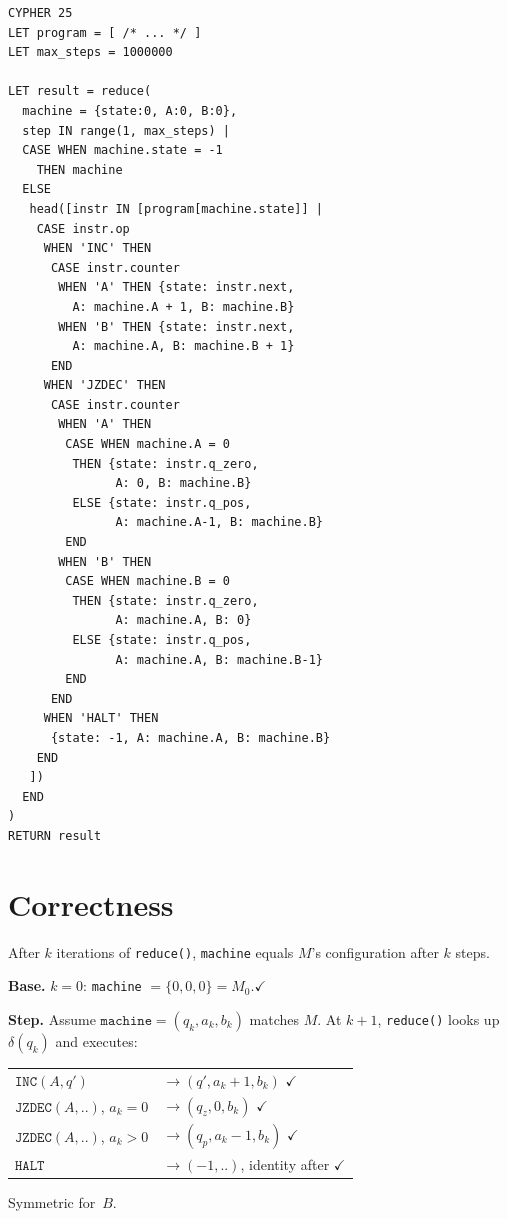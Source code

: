 \documentclass[sigconf, nonacm]{acmart}
\begin{document}
\begin{codeblock}
\begin{lstlisting}[style=cypher]
CYPHER 25
LET program = [ /* ... */ ]
LET max_steps = 1000000

LET result = reduce(
  machine = {state:0, A:0, B:0},
  step IN range(1, max_steps) |
  CASE WHEN machine.state = -1
    THEN machine
  ELSE
   head([instr IN [program[machine.state]] |
    CASE instr.op
     WHEN 'INC' THEN
      CASE instr.counter
       WHEN 'A' THEN {state: instr.next,
         A: machine.A + 1, B: machine.B}
       WHEN 'B' THEN {state: instr.next,
         A: machine.A, B: machine.B + 1}
      END
     WHEN 'JZDEC' THEN
      CASE instr.counter
       WHEN 'A' THEN
        CASE WHEN machine.A = 0
         THEN {state: instr.q_zero,
               A: 0, B: machine.B}
         ELSE {state: instr.q_pos,
               A: machine.A-1, B: machine.B}
        END
       WHEN 'B' THEN
        CASE WHEN machine.B = 0
         THEN {state: instr.q_zero,
               A: machine.A, B: 0}
         ELSE {state: instr.q_pos,
               A: machine.A, B: machine.B-1}
        END
      END
     WHEN 'HALT' THEN
      {state: -1, A: machine.A, B: machine.B}
    END
   ])
  END
)
RETURN result
\end{lstlisting}
\end{codeblock}

\section{Correctness}

\begin{claimbox}[Claim]
After $k$ iterations of \texttt{reduce()}, \texttt{machine} equals
$M$'s configuration after $k$ steps.
\end{claimbox}

\begin{proofbox}
\textbf{Base.} $k{=}0$: \texttt{machine} $= \{0,0,0\} = M_0$.\enspace$\checkmark$

\textbf{Step.} Assume $\texttt{machine} = (q_k, a_k, b_k)$ matches $M$.
At $k{+}1$, \texttt{reduce()} looks up $\delta(q_k)$ and executes:

{\small
\begin{tabular}{@{}ll@{}}
$\texttt{INC}(A,q')$ & $\to (q', a_k{+}1, b_k)$ \enspace$\checkmark$ \\
$\texttt{JZDEC}(A,..)$, $a_k{=}0$ & $\to (q_z, 0, b_k)$ \enspace$\checkmark$ \\
$\texttt{JZDEC}(A,..)$, $a_k{>}0$ & $\to (q_p, a_k{-}1, b_k)$ \enspace$\checkmark$ \\
$\texttt{HALT}$ & $\to (-1, ..)$, identity after \enspace$\checkmark$ \\
\end{tabular}}

\noindent Symmetric for~$B$.
\end{proofbox}
\end{document}
